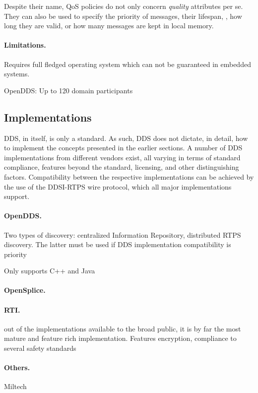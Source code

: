 Despite their name, QoS policies do not only concern \emph{quality} attributes per se. They can also be used to specify the priority of messages, their lifespan, \ie , how long they are valid, or how many messages are kept in local memory.


\paragraph{Limitations.}
Requires full fledged operating system which can not be guaranteed in embedded systems.

OpenDDS: Up to 120 domain participants




\subsection{Implementations}
DDS, in itself, is only a standard. As such, DDS does not dictate, in detail, how to implement the concepts presented in the earlier sections. A number of DDS implementations from different vendors exist, all varying in terms of standard compliance, features beyond the standard, licensing, and other distinguishing factors. Compatibility between the respective implementations can be achieved by the use of the DDSI-RTPS wire protocol, which all major implementations support.

\paragraph{OpenDDS.}
Two types of discovery: centralized Information Repository, distributed RTPS discovery. The latter must be used if DDS implementation compatibility is priority

Only supports C++ and Java

\paragraph{OpenSplice.}


\paragraph{RTI.}
out of the implementations available to the broad public, it is by far the most mature and feature rich implementation.
Features encryption, compliance to several safety standards

\paragraph{Others.}
Miltech